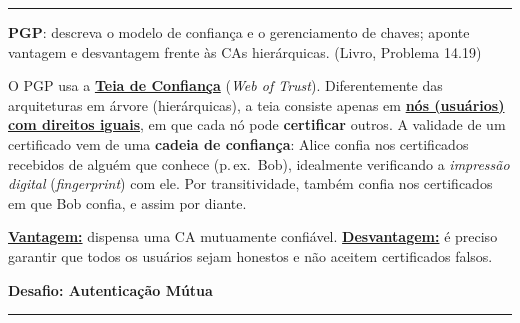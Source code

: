 \documentclass[11pt,a4paper]{article}
\newcommand{\livro}[1]{{\footnotesize\color{black!50}(Livro, Problema #1)}}
\newcommand{\alert}[1]{\textbf{\uline{#1}}}
\newcommand{\parte}[1]{%
    \par\vspace{1.6em}\noindent
    {\large\bfseries\color{red!55!black}#1}%
    \par\nobreak\vspace{-0.4em}\noindent
    {\color{red!45!black}\rule{\linewidth}{1.0pt}}%
    \par\nobreak\vspace{0.2em}
}
\newcommand{\exercicio}[1]{%
    \Needspace{8\baselineskip}%
    \par\vspace{1.2em}
    \noindent
    {\color{black!55}\rule[-0.25em]{3pt}{1.6em}}%
    \hspace{0.6em}{\Large\bfseries Exerc\'{i}cio #1}
    \par\vspace{-0.4em}
    \noindent{\color{black!35}\rule{\textwidth}{0.4pt}}
    \par\vspace{0.35em}
}
\newenvironment{resposta}{%
    \begin{respostabox}
    \color{red!70!black}\sloppy
}{%
    \end{respostabox}
}
\begin{document}
\exercicio{10}
\textbf{PGP}: descreva o modelo de confian\c{c}a e o gerenciamento de chaves; aponte vantagem e desvantagem frente \`{a}s CAs hier\'{a}rquicas. \livro{14.19}
\begin{resposta}
O PGP usa a \alert{Teia de Confian\c{c}a} (\textit{Web of Trust}). Diferentemente das arquiteturas em \'{a}rvore (hier\'{a}rquicas), a teia consiste apenas em \alert{n\'{o}s (usu\'{a}rios) com direitos iguais}, em que cada n\'{o} pode \textbf{certificar} outros. A validade de um certificado vem de uma \textbf{cadeia de confian\c{c}a}: Alice confia nos certificados recebidos de algu\'{e}m que conhece (p.\,ex.\ Bob), idealmente verificando a \emph{impress\~{a}o digital} (\textit{fingerprint}) com ele. Por transitividade, tamb\'{e}m confia nos certificados em que Bob confia, e assim por diante.

\alert{Vantagem:} dispensa uma CA mutuamente confi\'{a}vel. \alert{Desvantagem:} \'{e} preciso garantir que todos os usu\'{a}rios sejam honestos e n\~{a}o aceitem certificados falsos.
\end{resposta}

\parte{Desafio: Autentica\c{c}\~{a}o M\'{u}tua}
\end{document}
